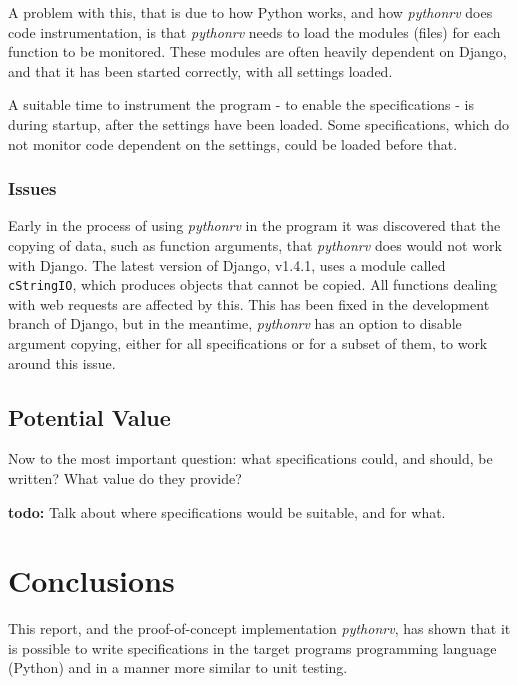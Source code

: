 \documentclass[a4paper,11pt]{kth-mag}
\newcommand{\todo}[1]{\textbf{todo: #1}}
\begin{document}
A problem with this, that is due to how Python works, and how \textit{pythonrv}
does code instrumentation, is that \textit{pythonrv} needs to load the modules
(files) for each function to be monitored. These modules are often heavily
dependent on Django, and that it has been started correctly, with all settings
loaded.

A suitable time to instrument the program - to enable the specifications - is
during startup, after the settings have been loaded. Some specifications, which
do not monitor code dependent on the settings, could be loaded before that.


\subsection{Issues}

Early in the process of using \textit{pythonrv} in the program it was
discovered that the copying of data, such as function arguments, that
\textit{pythonrv} does would not work with Django. The latest version of
Django, v1.4.1, uses a module called \texttt{cStringIO}, which produces objects
that cannot be copied. All functions dealing with web requests are affected by
this. This has been fixed in the development branch of Django, but in the
meantime, \textit{pythonrv} has an option to disable argument copying, either
for all specifications or for a subset of them, to work around this issue.


\section{Potential Value}

Now to the most important question: what specifications could, and should, be
written? What value do they provide?

\todo{}
Talk about where specifications would be suitable, and for what.





\pagestyle{newchap}
\chapter{Conclusions} \label{chapter-conclusions}

This report, and the proof-of-concept implementation \textit{pythonrv}, has
shown that it is possible to write specifications in the target programs
programming language (Python) and in a manner more similar to unit testing.
\end{document}
